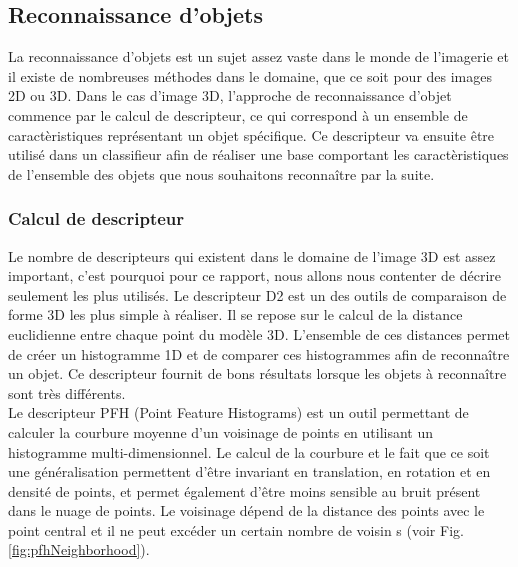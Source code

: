 \subsection{Reconnaissance d'objets}
La reconnaissance d'objets est un sujet assez vaste dans le monde de l'imagerie et il existe de nombreuses
méthodes dans le domaine, que ce soit pour des images 2D ou 3D. Dans le cas d'image 3D, l'approche de reconnaissance
d'objet commence par le calcul de descripteur, ce qui correspond à un ensemble de caractèristiques représentant un objet spécifique. 
Ce descripteur va ensuite être utilisé dans un classifieur afin de réaliser une base comportant les caractèristiques de 
l'ensemble des objets que nous souhaitons reconnaître par la suite.

\subsubsection{Calcul de descripteur}
\label{descriptor}
Le nombre de descripteurs qui existent dans le domaine de l'image 3D est assez important, c'est pourquoi pour ce rapport,
nous allons nous contenter de décrire seulement les plus utilisés. Le descripteur D2\cite{D2} est un des outils de 
comparaison de forme 3D les plus simple à réaliser. Il se repose sur le calcul de la distance euclidienne entre 
chaque point du modèle 3D. L'ensemble de ces distances permet de créer un histogramme 1D et de comparer ces histogrammes
afin de reconnaître un objet. Ce descripteur fournit de bons résultats lorsque les objets à reconnaître sont très 
différents.\\

Le descripteur PFH\cite{PFH} (Point Feature Histograms) est un outil permettant de calculer la courbure moyenne d'un voisinage de points en utilisant un histogramme multi-dimensionnel. Le calcul de la courbure et le fait que ce soit une généralisation permettent d'être invariant 
en translation, en rotation et en densité de points, et permet également d'être moins sensible au bruit présent dans le nuage de points. Le voisinage 
dépend de la distance des points avec le point central et il ne peut excéder un certain nombre de voisin s
(voir Fig. \ref{fig:pfhNeighborhood}).\\

